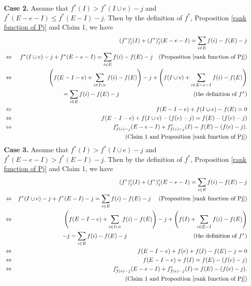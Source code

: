 \documentclass[preprint,10pt]{elsarticle}
\theoremstyle{plain}
\theoremstyle{definition}
\theoremstyle{remark}
\begin{document}
\vskip0.2cm
\noindent \textbf{Case 2.} Assume that \(f^*(I) > f^*(I\cup e)-j\) and \(f^*(E-e-I) \leq f^*(E-I)-j\). Then by the definition of $f^*$,  Proposition \ref{rank function of Pj} and Claim 1, we have
\begin{eqnarray*}
&&(f^*)_{j}^{e}(I) + (f^*)_{j}^{e}(E-e-I)= \sum_{i \in E} f(i) - f(E)-j \\
& \Leftrightarrow & f^*(I\cup e)-j + f^*(E-e-I)= \sum_{i \in E} f(i) - f(E)-j~~~\text{(Proposition \ref{rank function of Pj})}\\
 & \Leftrightarrow &\left(f(E-I-e)+ \sum_{i \in I\cup e} f(i) - f(E)\right) -j + \left(f(I\cup e) + \sum_{i \in E-e-I} f(i) - f(E)\right)\\
 & &=\sum_{i \in E} f(i) - f(E)-j~~~~~~~~~~~~~~~~~~~~~~~~~~~~~~~~~~~~~~\text{(the definition of $f^*$)}\\
 & \Leftrightarrow &f(E-I-e) + f(I\cup e) - f(E)=  0\\
 & \Leftrightarrow &f(E-I-e) + f(I\cup e) -(f(e)-j)= f(E)-(f(e)-j)\\
 & \Leftrightarrow & f_{f(e)-j}^{e}(E-e-I)+f_{f(e)-j}^{e}(I)= f(E)-(f(e)-j).\\
& & ~~~~~~~~~~~~~~~~~~~~~~~~~~~~~~~~~~~~~~~~~~~~~~~~~~~~~~~\text{(Claim 1 and Proposition \ref{rank function of Pj})}
  \end{eqnarray*}
\vskip0.2cm
\noindent   \textbf{Case 3.} Assume that \(f^*(I) > f^*(I\cup e)-j\) and \(f^*(E-e-I) > f^*(E-I)-j\). Then by the definition of $f^*$,  Proposition \ref{rank function of Pj} and Claim 1, we have
\begin{eqnarray*}
&&(f^*)_{j}^{e}(I) + (f^*)_{j}^{e}(E-e-I)= \sum_{i \in E} f(i) - f(E)-j \\
& \Leftrightarrow &f^*(I\cup e)-j + f^*(E-I)-j= \sum_{i \in E} f(i) - f(E)-j~~~~\text{(Proposition \ref{rank function of Pj})}\\
 & \Leftrightarrow &\left(f(E-I-e)+ \sum_{i \in I\cup e} f(i) - f(E)\right)-j  + \left(f(I) + \sum_{i \in E-I} f(i) - f(E)\right)\\
 & &-j=\sum_{i \in E} f(i) - f(E)-j~~~~~~~~~~~~~~~~~~~~~~~~~~~~~~~~~~\text{(the definition of $f^*$)}\\
 & \Leftrightarrow &f(E-I-e) + f(e)+f(I) - f(E)-j = 0\\
 & \Leftrightarrow &f(E-I-e)+f(I)=f(E)-(f(e)-j)\\
 & \Leftrightarrow &f_{f(e)-j}^{e}(E-e-I)+f_{f(e)-j}^{e}(I)=f(E)-(f(e)-j).\\
& & ~~~~~~~~~~~~~~~~~~~~~~~~~~~~~~~~~~~~~~~~~~~~~~~~~~~~~~~\text{(Claim 1 and Proposition \ref{rank function of Pj})}
  \end{eqnarray*}
\end{document}
